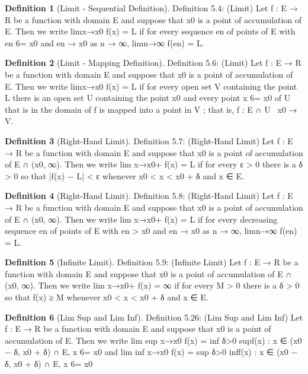 \documentclass[11pt]{article}
\theoremstyle{definition}
\newtheorem{definition}{Definition}[section]
\begin{document}
\setcounter{definition}{3}
\begin{definition} [Limit - Sequential Definition]
	Definition 5.4: (Limit) Let f : E → R be a function with domain E and suppose that x0 is a point of
	accumulation of E. Then we write
	limx→x0
	f(x) = L
	if for every sequence {en} of points of E with en 6= x0 and en → x0 as n → ∞,
	limn→∞
	f(en) = L.
\end{definition}

\setcounter{definition}{5}
\begin{definition} [Limit - Mapping Definition]
	Definition 5.6: (Limit) Let f : E → R be a function with domain E and suppose that x0 is a point of
	accumulation of E. Then we write
	limx→x0
	f(x) = L
	if for every open set V containing the point L there is an open set U containing the point x0 and every
	point x 6= x0 of U that is in the domain of f is mapped into a point in V ; that is,
	f : E ∩ U \ {x0} → V.
\end{definition}


\begin{definition} [Right-Hand Limit]
	Definition 5.7: (Right-Hand Limit) Let f : E → R be a function with domain E and suppose that x0
	is a point of accumulation of E ∩ (x0, ∞). Then we write
	lim x→x0+
	f(x) = L
	if for every ε > 0 there is a δ > 0 so that
	|f(x) − L| < ε
	whenever x0 < x < x0 + δ and x ∈ E.
\end{definition}


\begin{definition} [Right-Hand Limit]
	Definition 5.8: (Right-Hand Limit) Let f : E → R be a function with domain E and suppose that x0
	is a point of accumulation of E ∩ (x0, ∞). Then we write
	lim x→x0+
	f(x) = L
	if for every decreasing sequence {en} of points of E with en > x0 and en → x0 as n → ∞,
	limn→∞
	f(en) = L.
\end{definition}


\begin{definition} [Infinite Limit]
	Definition 5.9: (Infinite Limit) Let f : E → R be a function with domain E and suppose that x0 is a
	point of accumulation of E ∩ (x0, ∞). Then we write
	lim x→x0+
	f(x) = ∞
	if for every M > 0 there is a δ > 0 so that f(x) ≥ M whenever
	x0 < x < x0 + δ and x ∈ E.
\end{definition}

\setcounter{definition}{25}
\begin{definition} [Lim Sup and Lim Inf]
	Definition 5.26: (Lim Sup and Lim Inf) Let f : E → R be a function with domain E and suppose
	that x0 is a point of accumulation of E. Then we write
	lim sup
	x→x0
	f(x) = inf
	δ>0
	sup{f(x) : x ∈ (x0 − δ, x0 + δ) ∩ E, x 6= x0}
	and
	lim inf
	x→x0
	f(x) = sup
	δ>0
	inf{f(x) : x ∈ (x0 − δ, x0 + δ) ∩ E, x 6= x0}
\end{definition}
\end{document}
